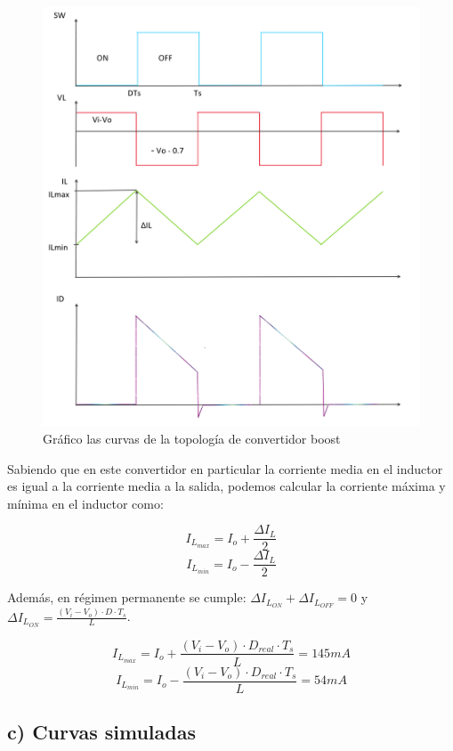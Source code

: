 \documentclass[e4_tp1_main.tex]{subfiles}
\begin{document}
\begin{figure}[H]
  \centering
    \includegraphics[scale = 0.6]{Imagenes/punto2/Dibujo}
  \caption{Gr\'afico las curvas de la topolog\'ia de convertidor boost}
  \label{fig:dibujo}
\end{figure}


Sabiendo que en este convertidor en particular la corriente media en el inductor es igual a la corriente media a la salida, podemos calcular la corriente m\'axima y m\'inima en el inductor como:

$$I_{L_{max}}= I_o + \frac{\Delta I_L}{2}$$
$$I_{L_{min}}= I_o - \frac{\Delta I_L}{2}$$

Adem\'as, en r\'egimen permanente se cumple: $\Delta I_{L_{ON}}+\Delta I_{L_{OFF}}=0$ y $\Delta I_{L_{ON}}=\frac{(V_i-V_o)\cdot D\cdot T_s}{L}$.

$$I_{L_{max}}= I_o + \frac{(V_i-V_o)\cdot D_{real}\cdot T_s}{L}=145mA$$
$$I_{L_{min}}= I_o - \frac{(V_i-V_o)\cdot D_{real}\cdot T_s}{L}=54mA$$



\subsection*{c) Curvas simuladas}
\end{document}
